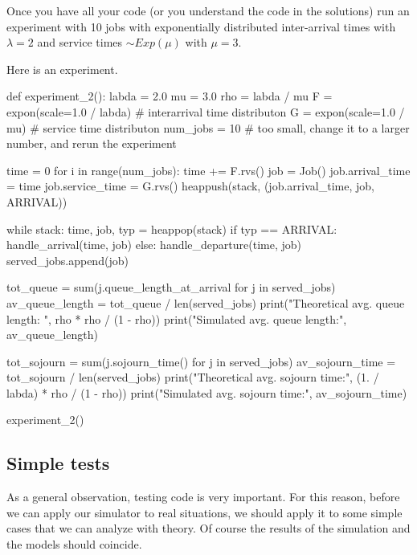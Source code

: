 \begin{exercise}
  Once you have all your code (or you understand the code in the solutions) run an experiment with 10 jobs with exponentially distributed inter-arrival times with $\lambda=2$ and service times $\sim Exp(\mu)$ with $\mu=3$.
\begin{solution}
Here is an experiment.
\begin{pyverbatim}
def experiment_2():
    labda = 2.0
    mu = 3.0
    rho = labda / mu
    F = expon(scale=1.0 / labda)  # interarrival time distributon
    G = expon(scale=1.0 / mu)  # service time distributon
    num_jobs = 10  # too small, change it to a larger number, and rerun the experiment

    time = 0
    for i in range(num_jobs):
        time += F.rvs()
        job = Job()
        job.arrival_time = time
        job.service_time = G.rvs()
        heappush(stack, (job.arrival_time, job, ARRIVAL))

    while stack:
        time, job, typ = heappop(stack)
        if typ == ARRIVAL:
            handle_arrival(time, job)
        else:
            handle_departure(time, job)
            served_jobs.append(job)

    tot_queue = sum(j.queue_length_at_arrival for j in served_jobs)
    av_queue_length = tot_queue / len(served_jobs)
    print("Theoretical avg. queue length: ", rho * rho / (1 - rho))
    print("Simulated avg. queue length:", av_queue_length)

    tot_sojourn = sum(j.sojourn_time() for j in served_jobs)
    av_sojourn_time = tot_sojourn / len(served_jobs)
    print("Theoretical avg. sojourn time:", (1. / labda) * rho / (1 - rho))
    print("Simulated avg. sojourn time:", av_sojourn_time)


experiment_2()
\end{pyverbatim}
\end{solution}

\end{exercise}

\subsection{Simple tests}
\label{sec:testing}

As a general observation, testing code is very important.
For this reason, before we can apply our simulator to real situations, we should apply it to some simple cases that we can analyze with theory.
Of course the results of the simulation and the models should coincide.

